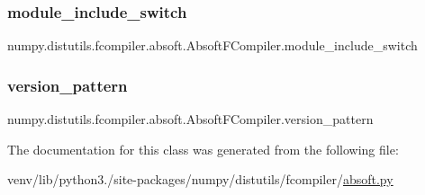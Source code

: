 \subsubsection{\texorpdfstring{module\+\_\+include\+\_\+switch}{module\_include\_switch}}
{\footnotesize\ttfamily numpy.\+distutils.\+fcompiler.\+absoft.\+Absoft\+F\+Compiler.\+module\+\_\+include\+\_\+switch\hspace{0.3cm}{\ttfamily [static]}}

\mbox{\label{classnumpy_1_1distutils_1_1fcompiler_1_1absoft_1_1AbsoftFCompiler_aeed1bcf7675b07e888128a98547f688a}} 
\subsubsection{\texorpdfstring{version\+\_\+pattern}{version\_pattern}}
{\footnotesize\ttfamily numpy.\+distutils.\+fcompiler.\+absoft.\+Absoft\+F\+Compiler.\+version\+\_\+pattern\hspace{0.3cm}{\ttfamily [static]}}



The documentation for this class was generated from the following file\+:\begin{DoxyCompactItemize}
\item 
venv/lib/python3./site-\/packages/numpy/distutils/fcompiler/\hyperlink{absoft_8py}{absoft.\+py}\end{DoxyCompactItemize}
